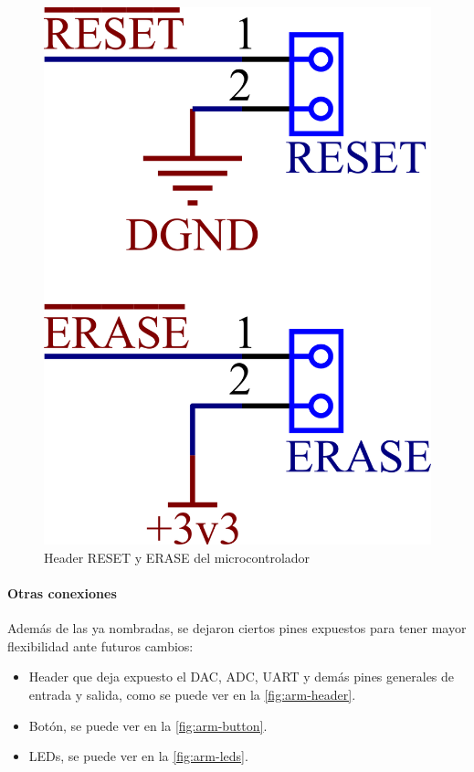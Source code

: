 \documentclass[titlepage, 12pt]{article}
\begin{document}
    \begin{figure}[!htbp]
        \centering
        \includegraphics[scale=1.5]{images/arm-reset-erase.png}
        \caption{Header RESET y ERASE del microcontrolador}
        \label{fig:arm-reset-erase}
    \end{figure}

 \paragraph{Otras conexiones}
 Además de las ya nombradas, se dejaron ciertos pines expuestos para tener mayor flexibilidad ante futuros cambios:
    \begin{itemize}
        \item Header que deja expuesto el DAC, ADC, UART y demás pines generales de entrada y salida, como se puede ver en la \autoref{fig:arm-header}.
        \item Botón, se puede ver en la \autoref{fig:arm-button}.
        \item LEDs, se puede ver en la \autoref{fig:arm-leds}.
    \end{itemize}
\end{document}
